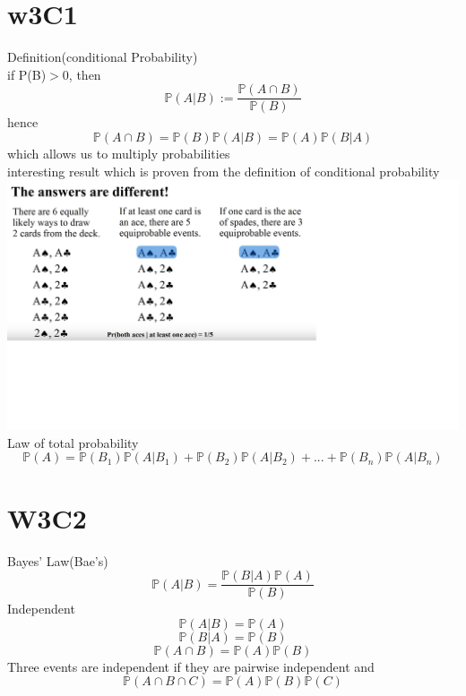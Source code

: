 \documentclass{article}
\begin{document}
\section{w3C1}
Definition(conditional Probability)\\
if P(B)$>$0, then
$$
\mathbb{P}(A|B):=\frac{\mathbb{P}{(A \cap B)}}{\mathbb{P}(B)}
$$
hence
$$
\mathbb{P}(A \cap B)=\mathbb{P}(B)\mathbb{P}(A|B)=\mathbb{P}(A)\mathbb{P}(B|A)
$$
which allows us to multiply probabilities \\
interesting result which is proven from the definition of conditional probability\\
\includegraphics[width=\textwidth]{different}
Law of total probability
$$
\mathbb{P}(A)=\mathbb{P}(B_1)\mathbb{P}(A|B_1)+\mathbb{P}(B_2)\mathbb{P}(A|B_2)+...+\mathbb{P}(B_n)\mathbb{P}(A|B_n)
$$
\section {W3C2}
Bayes' Law(Bae's)
$$
\mathbb{P}(A|B)=\frac{\mathbb{P}{(B|A)}\mathbb{P}{(A)}}{\mathbb{P}(B)}
$$
Independent
$$
\mathbb{P}(A|B)=\mathbb P (A)
$$
$$
\mathbb P (B|A)=\mathbb P (B)
$$
$$
\mathbb P (A\cap B)=\mathbb P (A) \mathbb P (B)
$$
Three events are independent if they are pairwise independent and
$$
\mathbb P (A\cap B \cap C)=\mathbb P(A)\mathbb P(B) \mathbb P(C)
$$
\end{document}
